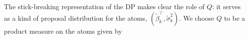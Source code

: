The stick-breaking representation of the DP makes clear the role of $Q$: it serves as a kind of proposal distribution for the atoms, $\left(\tilde{\beta}_k^\top ,\tilde{\sigma}^2_k\right)$. We choose $Q$ to be a product measure on the atoms given by
%
%

